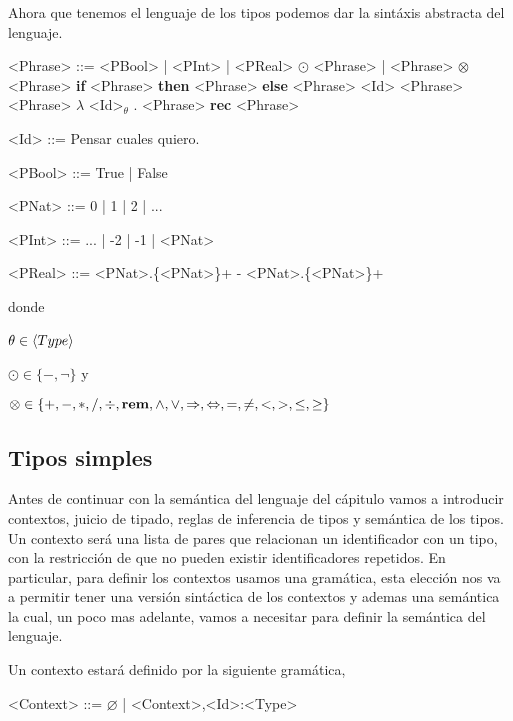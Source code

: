 Ahora que tenemos el lenguaje de los tipos podemos dar la sint\'axis
abstracta del lenguaje.

\setlength{\grammarindent}{6em}
\begin{grammar}

<Phrase> ::= <PBool> | <PInt> | <PReal>
\alt $\odot$ <Phrase> | <Phrase> $\otimes$ <Phrase>
\alt \textbf{if} <Phrase> \textbf{then} <Phrase> \textbf{else} <Phrase>
\alt <Id> 
\alt <Phrase> <Phrase>
\alt $\lambda$ <Id>$_\theta$ . <Phrase>
\alt \textbf{rec} <Phrase>

<Id>    ::= Pensar cuales quiero.

<PBool> ::= True | False

<PNat>  ::= 0 | 1 | 2 | ...

<PInt>  ::= ... | -2 | -1 | <PNat> 

<PReal> ::= <PNat>.\{<PNat>\}+ 
\alt - <PNat>.\{<PNat>\}+

\end{grammar}

\noindent
donde \ 

$\theta \in \langle Type \rangle$ \

$\odot \in \{-, \neg\}$ y \

$\otimes \in \{+,-,*,/,\div,\textbf{rem},\wedge,\vee,\Rightarrow,\Leftrightarrow, =,\neq,<,>,\leq,\geq\}$

\subsection{Tipos simples}

Antes de continuar con la sem\'antica del lenguaje del c\'apitulo
vamos a introducir contextos, juicio de tipado, reglas de inferencia de tipos y
sem\'antica de los tipos.\\

Un contexto ser\'a una lista de pares que relacionan un identificador 
con un tipo, con la restricci\'on de que no pueden
existir identificadores repetidos. En particular, para
definir los contextos usamos una gram\'atica, esta elecci\'on 
nos va a permitir tener una versi\'on sint\'actica de los contextos
y ademas una sem\'antica la cual, un poco mas adelante, vamos a
necesitar para definir la sem\'antica del lenguaje.

\begin{definition}\label{lambdaa:context}

Un contexto estar\'a definido por la siguiente gram\'atica,\

\begin{grammar}

<Context> ::= $\varnothing$ | <Context>,<Id>:<Type>

\end{grammar}

\end{definition}


